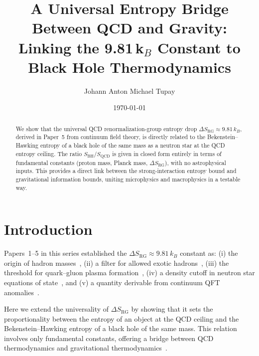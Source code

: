\documentclass[aps,prd,onecolumn,nofootinbib,superscriptaddress]{revtex4-2}
\begin{document}
\title{A Universal Entropy Bridge Between QCD and Gravity:\\
Linking the 9.81\,k$_B$ Constant to Black Hole Thermodynamics}

\author{Johann Anton Michael Tupay}

\date{\today}

\begin{abstract}
We show that the universal QCD renormalization-group entropy drop
$\Delta S_{\mathrm{RG}} \approx 9.81\,k_B$, derived in Paper~5 from continuum
field theory, is directly related to the Bekenstein--Hawking entropy of
a black hole of the same mass as a neutron star at the QCD entropy ceiling.
The ratio $S_{\mathrm{BH}} / S_{\mathrm{QCD}}$ is given in closed form entirely
in terms of fundamental constants (proton mass, Planck mass, $\Delta S_{\mathrm{RG}}$),
with no astrophysical inputs. This provides a direct link between the
strong-interaction entropy bound and gravitational information bounds,
uniting microphysics and macrophysics in a testable way.
\end{abstract}

\maketitle

\section{Introduction}

Papers~1--5 in this series established the $\Delta S_{\mathrm{RG}} \approx 9.81\,k_B$ constant as:
(i) the origin of hadron masses~\cite{paper1,weinberg1972,collins1974},
(ii) a filter for allowed exotic hadrons~\cite{paper2,esposito2017,brambilla2020},
(iii) the threshold for quark--gluon plasma formation~\cite{paper3,bazavov2014,borsanyi2014},
(iv) a density cutoff in neutron star equations of state~\cite{paper4,ozel2016,lattimer2007},
and (v) a quantity derivable from continuum QFT anomalies~\cite{paper5,casini2011,komargodski2011}.

Here we extend the universality of $\Delta S_{\mathrm{RG}}$ by showing that it
sets the proportionality between the entropy of an object at the QCD ceiling
and the Bekenstein--Hawking entropy of a black hole of the same mass.
This relation involves only fundamental constants, offering a bridge between
QCD thermodynamics and gravitational thermodynamics~\cite{bekenstein1973,hawking1975,misner1973,wald1984}.
\end{document}
